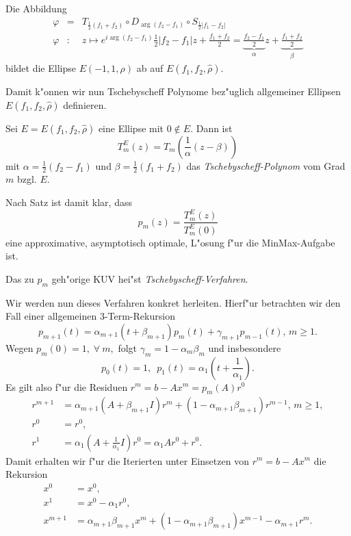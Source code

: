 \begin{lem}\label{ellipsentransf_lem} 
Die Abbildung
\begin{eqnarray*}
\varphi &=& T_{\frac{1}{2}(f_1+f_2)} \circ D_{\arg(f_2-f_1)} \circ S_{\frac{1}{2}\left| f_1
- f_2 \right|} \\
\varphi&:& z \mapsto e^{i \arg(f_2-f_1)}\frac{1}{2} \left| f_2-f_1 \right| z +
    \frac{f_1+f_2}{2} = \underbrace{\frac{f_2-f_1}{2}}_{\alpha} z + \underbrace{\frac{f_1+f_2}{2}}_{\beta}
\end{eqnarray*}
bildet die Ellipse $E(-1,1,\rho)$ ab auf $E(f_1,f_2,\hat{\rho})$. 
\end{lem}

Damit k"onnen wir nun Tschebyscheff Polynome  bez"uglich allgemeiner
Ellipsen $E(f_1,f_2,\hat{\rho})$ definieren.

\begin{defn}
Sei $E=E(f_1,f_2,\hat{\rho})$ eine Ellipse mit $0 \not \in E$. Dann ist
\[
T_m^E(z) = T_m \left( \frac{1}{\alpha}(z- \beta) \right)
\]
mit $\alpha = \frac{1}{2}\left( f_2 - f_1 \right) $ und 
$ \beta = \frac{1}{2} \left( f_1 + f_2 \right)$ das
\emph{Tschebyscheff-Polynom} vom Grad $m$ bzgl. $E$. 
\end{defn}

Nach Satz  ist damit klar, dass
\[
p_m(z)=\frac{T_m^E(z)}{T_m^E(0)}
\]
eine approximative, asymptotisch optimale, L"osung f"ur die MinMax-Aufgabe
 ist.

\begin{defn}
Das zu $p_m$ geh"orige KUV hei"st \emph{Tschebyscheff-Verfahren}.
\end{defn}

Wir werden nun dieses Verfahren konkret herleiten. Hierf"ur betrachten wir den Fall 
einer allgemeinen 3-Term-Rekursion
\[
p_{m+1}(t) = \alpha_{m+1}(t+\beta_{m+1})p_{m}(t) + \gamma_{m+1}p_{m-1}(t) \text{, } m \ge 1.
\]
Wegen $p_m(0) = 1,\; \forall\ m,$ folgt $\gamma_m = 1- \alpha_m \beta_m$
und insbesondere
\[
 p_0(t) = 1, \enspace p_1(t) = \alpha_1 \left (t+ \frac{1}{\alpha_1} \right ).
\]
Es gilt also f"ur die Residuen $r^m = b - Ax^m = p_m(A)r^0$
\begin{align*}
r^{m+1} &= \alpha_{m+1}(A + \beta_{m+1} I) r^m+(1- \alpha_{m+1} \beta_{m+1})r^{m-1} \text{, } m \ge 1, \\
r^0 &= r^0, \\
r^1 &= \alpha_1\left(A + \frac{1}{\alpha_1} I\right) r^0 = \alpha_1 A r^0 + r^0.
\end{align*}
Damit erhalten wir f"ur die Iterierten unter Einsetzen von $r^m = b-Ax^m$ die Rekursion
\begin{align*}
x^0 &= x^0, \\
x^1 &= x^0 - \alpha_1 r^0 ,\\
x^{m+1} &= \alpha_{m+1} \beta_{m+1} x^m + (1- \alpha_{m+1} \beta_{m+1})x^{m-1} - \alpha_{m+1} r^m.
\end{align*}

